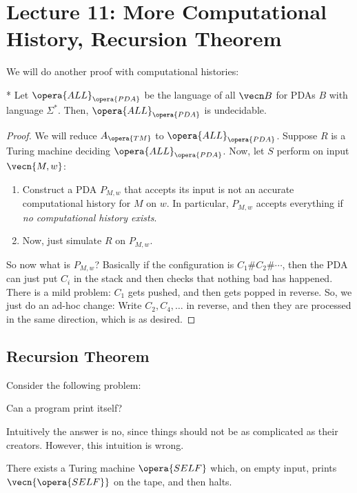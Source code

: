 \section*{Lecture 11: More Computational History, Recursion Theorem}
\setcounter{section}{11}

We will do another proof with computational histories:

\begin{thm}*
	Let $\opera{ALL}_{\opera{PDA}}$ be the language of all $\vecn B$ for PDAs $B$ with language $\Sigma^*$. Then, $\opera{ALL}_{\opera{PDA}}$ is undecidable.
\end{thm}

\begin{proof}
	We will reduce $A_{\opera{TM}}$ to $\opera{ALL}_{\opera{PDA}}$. Suppose $R$ is a Turing machine deciding $\opera{ALL}_{\opera{PDA}}$.
	Now, let $S$ perform on input $\vecn{M,w}$:
	\begin{enumerate}
		\item Construct a PDA $P_{M,w}$ that accepts its input is not an accurate computational history for $M$ on $w$. 
			In particular, $P_{M,w}$ accepts everything if \emph{no computational history exists}.
		\item Now, just simulate $R$ on $P_{M,w}$.
	\end{enumerate}
	So now what is $P_{M,w}$?
	Basically if the configuration is $C_1\# C_2 \# \cdots$, then the PDA can just put $C_i$ in the stack and then checks that nothing bad has happened.
	There is a mild problem: $C_1$ gets pushed, and then gets popped in reverse. So, we just do an ad-hoc change: Write $C_2, C_4, \ldots$ in reverse, and then they are processed in the same direction, which is as desired.
\end{proof}

\subsection{Recursion Theorem}

Consider the following problem: 

\begin{que}
	Can a program print itself? 
\end{que}

Intuitively the answer is no, since things should not be as complicated as their creators.
However, this intuition is wrong.

\begin{thm}
	There exists a Turing machine $\opera{SELF}$ which, on empty input, prints $\vecn{\opera{SELF}}$ on the tape, and then halts.
\end{thm}

